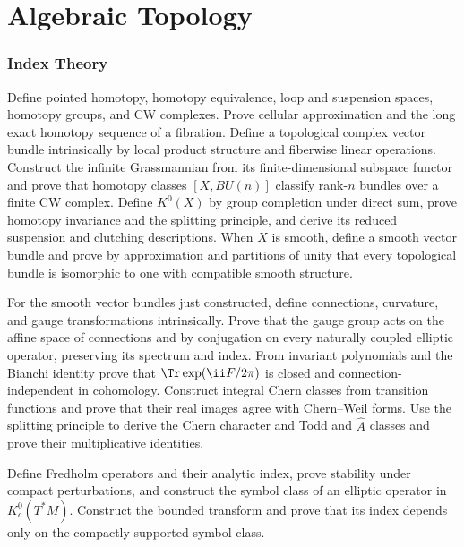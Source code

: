 \part{Algebraic Topology}

\section{Index Theory}

\begin{exercise}
Define pointed homotopy, homotopy equivalence, loop and suspension spaces,
homotopy groups, and CW complexes.  Prove cellular approximation and the long
exact homotopy sequence of a fibration.  Define a topological complex vector
bundle intrinsically by local product structure and fiberwise linear
operations.  Construct the infinite Grassmannian from its finite-dimensional
subspace functor and prove that homotopy classes $[X,BU(n)]$ classify rank-$n$
bundles over a finite CW complex.  Define $K^0(X)$ by group completion under
direct sum, prove homotopy invariance and the splitting principle, and derive
its reduced suspension and clutching descriptions.  When $X$ is smooth,
define a smooth vector bundle and prove by approximation and partitions of
unity that every topological bundle is isomorphic to one with compatible
smooth structure.
\end{exercise}

\begin{exercise}
For the smooth vector bundles just constructed, define connections, curvature,
and gauge transformations intrinsically.  Prove that the gauge group acts on
the affine space of connections and by conjugation on every naturally coupled
elliptic operator, preserving its spectrum and index.  From invariant
polynomials and the Bianchi
identity prove that $\Tr\exp(\ii F/2\pi)$ is closed and connection-independent
in cohomology.  Construct integral Chern classes from transition functions
and prove that their real images agree with Chern--Weil forms.  Use the
splitting principle to derive the Chern character and Todd and $\widehat A$
classes and prove their multiplicative identities.
\end{exercise}

\begin{exercise}
Define Fredholm operators and their analytic index, prove stability under
compact perturbations, and construct the symbol class of an elliptic operator
in $K^0_c(T^*M)$.  Construct the bounded transform and prove that its index
depends only on the compactly supported symbol class.
\end{exercise}

